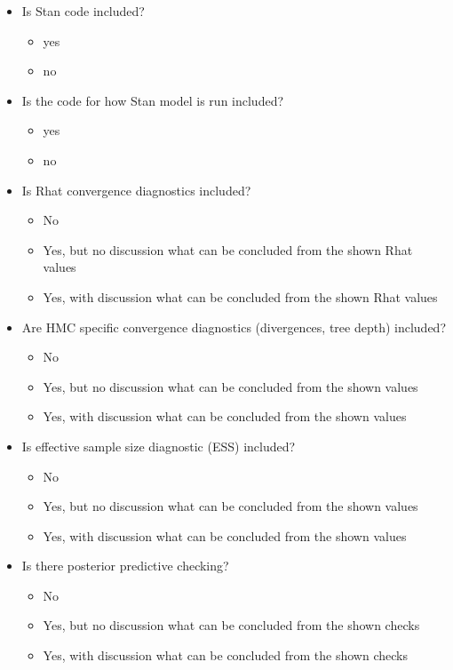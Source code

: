 \documentclass[a4paper,11pt]{article}
\begin{document}
\begin{itemize}
\item Is Stan code included?
  \begin{itemize}
  \item yes
  \item no
  \end{itemize}

  
\item Is the code for how Stan model is run included?
  \begin{itemize}
  \item yes
  \item no
  \end{itemize}

  \item Is Rhat convergence diagnostics included?
    \begin{itemize}
    \item No
    \item Yes, but no discussion what can be concluded from the shown Rhat values
    \item Yes, with discussion what can be concluded from the shown Rhat values
  \end{itemize}

  \item Are HMC specific convergence diagnostics (divergences, tree depth) included?
    \begin{itemize}
    \item No
    \item Yes, but no discussion what can be concluded from the shown values
    \item Yes, with discussion what can be concluded from the shown values
  \end{itemize}


  \item Is effective sample size diagnostic (ESS) included?
    \begin{itemize}
    \item No
    \item Yes, but no discussion what can be concluded from the shown values
    \item Yes, with discussion what can be concluded from the shown values
  \end{itemize}

\item Is there posterior predictive checking?
  \begin{itemize}
  \item No
  \item Yes, but no discussion what can be concluded from the shown checks
  \item Yes, with discussion what can be concluded from the shown checks
  \end{itemize}


\end{itemize}
\end{document}
